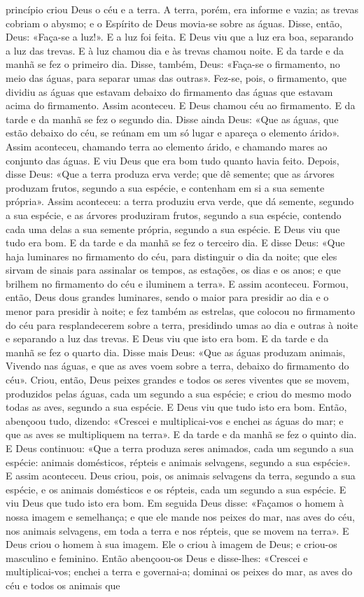 \begin{paracol}{2}
{ princípio criou Deus o céu e a terra. A terra, porém, era informe e vazia; as trevas cobriam o abysmo; e o Espírito de Deus movia-se sobre as águas. Disse, então, Deus: «Faça-se a luz!». E a luz foi feita. E Deus viu que a luz era boa, separando a luz das trevas. E à luz chamou dia e às trevas chamou noite. E da tarde e da manhã se fez o primeiro dia. Disse, também, Deus: «Faça-se o firmamento, no meio das águas, para separar umas das outras». Fez-se, pois, o firmamento, que dividiu as águas que estavam debaixo do firmamento das águas que estavam acima do firmamento. Assim aconteceu. E Deus chamou céu ao firmamento. E da tarde e da manhã se fez o segundo dia. Disse ainda Deus: «Que as águas, que estão debaixo do céu, se reúnam em um só lugar e apareça o elemento árido». Assim aconteceu, chamando terra ao elemento árido, e chamando mares ao conjunto das águas. E viu Deus que era bom tudo quanto havia feito. Depois, disse Deus: «Que a terra produza erva verde; que dê semente; que as árvores produzam frutos, segundo a sua espécie, e contenham em si a sua semente própria». Assim aconteceu: a terra produziu erva verde, que dá semente, segundo a sua espécie, e as árvores produziram frutos, segundo a sua espécie, contendo cada uma delas a sua semente própria, segundo a sua espécie. E Deus viu que tudo era bom. E da tarde e da manhã se fez o terceiro dia. E disse Deus: «Que haja luminares no firmamento do céu, para distinguir o dia da noite; que eles sirvam de sinais para assinalar os tempos, as estações, os dias e os anos; e que brilhem no firmamento do céu e iluminem a terra». E assim aconteceu. Formou, então, Deus dous grandes luminares, sendo o maior para presidir ao dia e o menor para presidir à noite; e fez também as estrelas, que colocou no firmamento do céu para resplandecerem sobre a terra, presidindo umas ao dia e outras à noite e separando a luz das trevas. E Deus viu que isto era bom. E da tarde e da manhã se fez o quarto dia. Disse mais Deus: «Que as águas produzam animais, Vivendo nas águas, e que as aves voem sobre a terra, debaixo do firmamento do céu». Criou, então, Deus peixes grandes e todos os seres viventes que se movem, produzidos pelas águas, cada um segundo a sua espécie; e criou do mesmo modo todas as aves, segundo a sua espécie. E Deus viu que tudo isto era bom. Então, abençoou tudo, dizendo: «Crescei e multiplicai-vos e enchei as águas do mar; e que as aves se multipliquem na terra». E da tarde e da manhã se fez o quinto dia. E Deus continuou: «Que a terra produza seres animados, cada um segundo a sua espécie: animais domésticos, répteis e animais selvagens, segundo a sua espécie». E assim aconteceu. Deus criou, pois, os animais selvagens da terra, segundo a sua espécie, e os animais domésticos e os répteis, cada um segundo a sua espécie. E viu Deus que tudo isto era bom. Em seguida Deus disse: «Façamos o homem à nossa imagem e semelhança; e que ele mande nos peixes do mar, nas aves do céu, nos animais selvagens, em toda a terra e nos répteis, que se movem na terra». E Deus criou o homem à sua imagem. Ele o criou à imagem de Deus; e criou-os masculino e feminino. Então abençoou-os Deus e disse-lhes: «Crescei e multiplicai-vos; enchei a terra e governai-a; dominai os peixes do mar, as aves do céu e todos os animais que }
\end{paracol}
